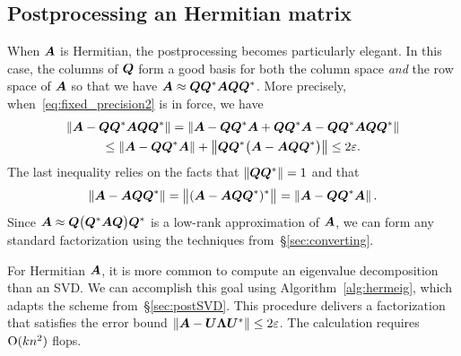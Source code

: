 \documentclass[final]{siamltex}
\newcommand{\pgnotate}[1]{{\color{blue}[#1]}}
\begin{document}
\lsp



\subsection{Postprocessing an Hermitian matrix}
\label{sec:postsym}

When $\bm{A}$ is Hermitian, the postprocessing becomes particularly elegant.
In this case, the columns of $\bm{Q}$ form a good basis for both the
column space \emph{and} the row space of $\bm{A}$ so that we have
$\bm{A} \approx \bm{QQ}^* \bm{A} \bm{QQ}^*$.
More precisely, when~\eqref{eq:fixed_precision2} is in force,
we have
\begin{multline}
\label{eq:twoepsilon}
\norm{\mtx{A} - \mtx{QQ}^{\adj}\mtx{A}\mtx{QQ}^{\adj}} =
\norm{\mtx{A} - \mtx{QQ}^{\adj}\mtx{A} + \mtx{QQ}^{\adj}\mtx{A} -
\mtx{QQ}^{\adj}\mtx{A}\mtx{QQ}^{\adj}} \\
\leq \norm{\mtx{A} - \mtx{QQ}^{\adj}\mtx{A}} +
\norm{\mtx{QQ}^{\adj}
\bigl(\mtx{A} - \mtx{AQQ}^{\adj} \bigr)} \leq 2\eps.
\end{multline}
The last inequality relies on the facts that $\left\Vert {\bm{QQ}^*} \right\Vert = 1$ and
that
$$
\left\Vert { \bm{A} - \bm{AQQ}^*} \right\Vert = {\bigl\Vert { (\bm{A} - \bm{AQQ}^*)^*} \bigr\Vert}_{}
    = \left\Vert { \bm{A} - \bm{QQ}^*\bm{A} } \right\Vert.
$$
Since $\bm{A} \approx \bm{Q}\bigl(\bm{Q}^*\bm{A} \bm{Q}\bigr)\bm{Q}^*$
is a low-rank approximation
of $\bm{A}$, we can form any standard factorization using the techniques from~\S\ref{sec:converting}.

For Hermitian $\bm{A}$, it is more common to compute an eigenvalue decomposition
than an SVD.  We can accomplish this goal using Algorithm~\ref{alg:hermeig}, which adapts the scheme
from~\S\ref{sec:postSVD}.
This procedure delivers a factorization that satisfies the error bound
$\left\Vert { \bm{A} - \bm{U\Lambda U}^*} \right\Vert \leq 2\varepsilon$.
The calculation requires $\mathrm{O}( k n^2 )$ flops.

\end{document}
